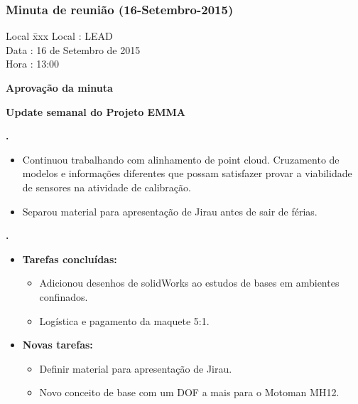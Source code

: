 \subsubsection{Minuta de reunião (16-Setembro-2015)}

\begin{tabbing}
  Local \= xxx \kill
  Local \> : LEAD \\
  Data  \> : 16 de Setembro de 2015 \\
  Hora  \> : 13:00
\end{tabbing}


\textbf{Aprovação da minuta}

\textbf{Update semanal do Projeto EMMA}
   							
							
\textbf{\gabriel.} 
	\begin{itemize}
			\item Continuou trabalhando com alinhamento de point cloud. Cruzamento de
			modelos e informações diferentes que possam satisfazer provar a viabilidade de sensores na atividade de calibração.
			\item Separou material para apresentação de Jirau antes de sair de férias.
			\end{itemize}
					
			
   \textbf{.} 
	\begin{itemize}
		\item \textbf{Tarefas concluídas:}
			\begin{itemize}  
			  \item Adicionou desenhos de solidWorks ao estudos de bases em ambientes
			  confinados.
			  \item Logística e pagamento da maquete 5:1.
			\end{itemize}
		
		\item \textbf{Novas tarefas:}
			\begin{itemize} 
				\item Definir material para apresentação de Jirau.
				\item Novo conceito de base com um DOF a mais para o Motoman MH12.
			\end{itemize}
	\end{itemize}

